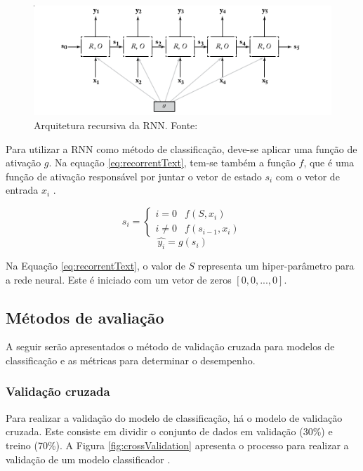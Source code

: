 \begin{figure}[ht]
	\centering
	\includegraphics[keepaspectratio=true,scale=0.8]{figuras/rnnText}
	\caption[Arquitetura recursiva da RNN]{Arquitetura recursiva da RNN. Fonte: }
	\label{fig:rnnText}
\end{figure}

Para utilizar a RNN como método de classificação, deve-se aplicar uma função de ativação $g$. Na equação \ref{eq:recorrentText}, tem-se também a função $f$, que é uma função de ativação responsável por juntar o vetor de estado $s_{i}$ com o vetor de entrada $x_{i}$ \cite{mikolov_recurrent_2010}.

\begin{equation}
	\label{eq:recorrentText}
	s_{i} = 
    \begin{cases}
    	i = 0 & f(S, x_{i}) \\
        i \neq 0 & f(s_{i-1}, x_{i})
    \end{cases}
\end{equation}
\begin{equation*}
	\hat{y_{i}} = g(s_{i})
\end{equation*}

Na Equação \ref{eq:recorrentText}, o valor de $S$ representa um hiper-parâmetro para a rede neural. Este é iniciado com um vetor de zeros $[0, 0, ..., 0]$.

\subsection{Métodos de avaliação}

A seguir serão apresentados o método de validação cruzada para modelos de classificação e as métricas para determinar o desempenho.

\subsubsection{Validação cruzada}

Para realizar a validação do modelo de classificação, há o modelo de validação cruzada. Este consiste em dividir o conjunto de dados em validação (30\%) e treino (70\%). A Figura \ref{fig:crossValidation} apresenta o processo para realizar a validação de um modelo classificador \cite{brink_real-world_2015}.

